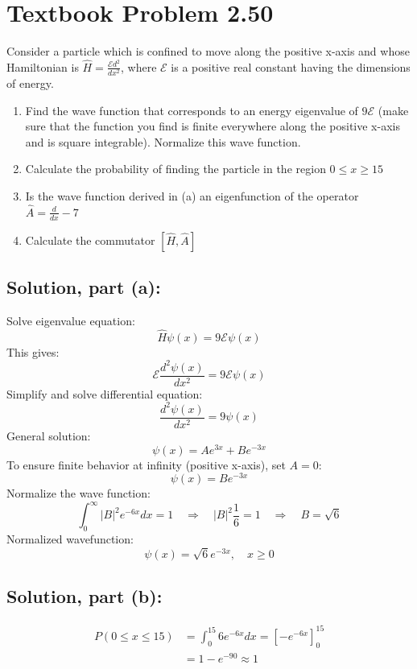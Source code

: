 \documentclass[12pt]{article}
\begin{document}
\section*{Textbook Problem 2.50}
    Consider a particle which is confined to move along the positive x-axis and whose Hamiltonian is $\hat{H} = \frac{\mathcal{E} d^2}{d x^2}$, where $\mathcal{E}$  is a positive real constant having the dimensions of energy.
    \begin{enumerate}
        \item [(a)] Find the wave function that corresponds to an energy eigenvalue of $9 \mathcal{E}$ (make sure that the function you find is finite everywhere along the positive x-axis and is square integrable). Normalize this wave function.
        \item [(b)] Calculate the probability of finding the particle in the region $0 \leq x \geq 15$
        \item [(c)] Is the wave function derived in (a) an eigenfunction of the operator $\hat{A} = \frac{d}{dx} - 7$
        \item [(d)] Calculate the commutator $[\hat{H}, \hat{A}]$
    \end{enumerate}

    \subsection*{Solution, part (a):}
        Solve eigenvalue equation:
        \[
        \hat{H}\psi(x)=9\mathcal{E}\psi(x)
        \]
        This gives:
        \[
        \mathcal{E}\frac{d^2\psi(x)}{dx^2}=9\mathcal{E}\psi(x)
        \]
        Simplify and solve differential equation:
        \[
        \frac{d^2\psi(x)}{dx^2}=9\psi(x)
        \]
        General solution:
        \[
        \psi(x)=Ae^{3x}+Be^{-3x}
        \]
        To ensure finite behavior at infinity (positive x-axis), set \(A=0\):
        \[
        \psi(x)=Be^{-3x}
        \]
        Normalize the wave function:
        \[
        \int_0^\infty |B|^2 e^{-6x} dx=1\quad\Rightarrow\quad|B|^2\frac{1}{6}=1\quad\Rightarrow\quad B=\sqrt{6}
        \]
        Normalized wavefunction:
        \[
        \psi(x)=\sqrt{6}e^{-3x}, \quad x\ge0
        \]
        
    \subsection*{Solution, part (b):}
        \begin{align*}
        P(0\le x\le15)&=\int_0^{15}6e^{-6x}dx=\left[-e^{-6x}\right]_0^{15}\\[6pt]
        &=1-e^{-90}\approx1
        \end{align*}
\end{document}
